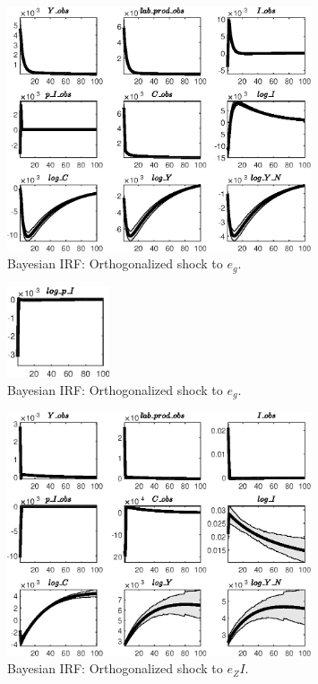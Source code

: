  
\begin{figure}[H]
\centering 
\includegraphics[width=0.80\textwidth]{BRS_growth_alt/Output/BRS_growth_alt_Bayesian_IRF_e_g_1}
\caption{Bayesian IRF: Orthogonalized shock to ${e_g}$.}
\label{Fig:BayesianIRF:e_g:1}
\end{figure}
 
\begin{figure}[H]
\centering 
\includegraphics[width=0.27\textwidth]{BRS_growth_alt/Output/BRS_growth_alt_Bayesian_IRF_e_g_2}
\caption{Bayesian IRF: Orthogonalized shock to ${e_g}$.}
\label{Fig:BayesianIRF:e_g:2}
\end{figure}
 
\begin{figure}[H]
\centering 
\includegraphics[width=0.80\textwidth]{BRS_growth_alt/Output/BRS_growth_alt_Bayesian_IRF_e_ZI_1}
\caption{Bayesian IRF: Orthogonalized shock to ${e_ZI}$.}
\label{Fig:BayesianIRF:e_ZI:1}
\end{figure}
 
